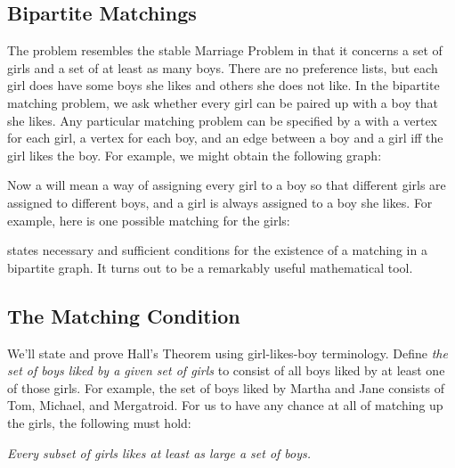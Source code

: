 \subsection{Bipartite Matchings}

The  problem resembles the stable Marriage
Problem in that it concerns a set of girls and a set of at least as many
boys.  There are no preference lists, but each girl does have some boys
she likes and others she does not like.  In the bipartite matching
problem, we ask whether every girl can be paired up with a boy that she
likes.  Any particular matching problem can be specified by a
 with a vertex for each girl, a vertex for each boy,
and an edge between a boy and a girl iff the girl likes the boy.  For
example, we might obtain the following graph:


Now a  will mean a way of assigning every girl to a boy so
that different girls are assigned to different boys, and a girl is always
assigned to a boy she likes.  For example, here is one possible matching
for the girls:


 states necessary and sufficient conditions
for the existence of a matching in a bipartite graph.  It turns out to be
a remarkably useful mathematical tool.  

\subsection{The Matching Condition}

We'll state and prove Hall's Theorem using girl-likes-boy terminology.
Define \emph{the set of boys liked by a given set of girls} to consist of
all boys liked by at least one of those girls.  For example, the set of
boys liked by Martha and Jane consists of Tom, Michael, and Mergatroid.
For us to have any chance at all of matching up the girls, the following
 must hold:

\bigskip
\begin{center}
\emph{Every subset of girls likes at least as large a set of boys.}
\end{center}
\bigskip

